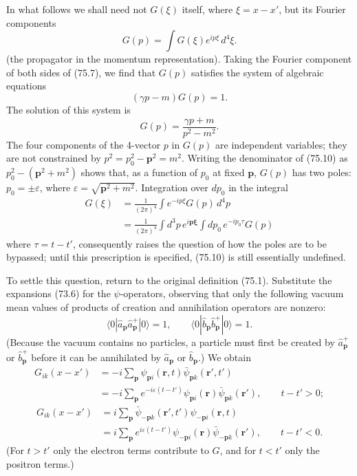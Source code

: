 In what follows we shall need not $G(\xi)$ itself, where $\xi=x-x'$, but its Fourier components
\begin{equation}
G(p)=\int G(\xi)e^{ip\xi}\,d^4\xi.
\tag{75.8}
\end{equation}
(the propagator in the momentum representation). Taking the Fourier component of both sides of (75.7), we find that $G(p)$ satisfies the system of algebraic equations
\begin{equation}
(\gamma p-m)G(p)=1.
\tag{75.9}
\end{equation}
The solution of this system is
\begin{equation}
G(p)=\frac{\gamma p+m}{p^2-m^2}.
\tag{75.10}
\end{equation}
The four components of the 4-vector $p$ in $G(p)$ are independent variables; they are not constrained by $p^2=p_0^2-\mathbf p^2=m^2$. Writing the denominator of (75.10) as $p_0^2-(\mathbf p^2+m^2)$ shows that, as a function of $p_0$ at fixed $\mathbf p$, $G(p)$ has two poles: $p_0=\pm\varepsilon$, where $\varepsilon=\sqrt{\mathbf p^2+m^2}$. Integration over $dp_0$ in the integral
\begin{equation}
\begin{aligned}
G(\xi)&=\frac{1}{(2\pi)^4}\int e^{-ip\xi}G(p)\,d^4p\\
&=\frac{1}{(2\pi)^4}\int d^3p\,e^{i\mathbf p\boldsymbol\xi}
\int dp_0\,e^{-ip_0\tau}G(p)
\end{aligned}
\tag{75.11}
\end{equation}
where $\tau=t-t'$, consequently raises the question of how the poles are to be bypassed; until this prescription is specified, (75.10) is still essentially undefined.

To settle this question, return to the original definition (75.1). Substitute the expansions (73.6) for the $\psi$-operators, observing that only the following vacuum mean values of products of creation and annihilation operators are nonzero:
\[
\langle0|\hat a_{\mathbf p}\hat a_{\mathbf p}^+|0\rangle=1,
\qquad
\langle0|\hat b_{\mathbf p}\hat b_{\mathbf p}^+|0\rangle=1.
\]
(Because the vacuum contains no particles, a particle must first be created by $\hat a_{\mathbf p}^+$ or $\hat b_{\mathbf p}^+$ before it can be annihilated by $\hat a_{\mathbf p}$ or $\hat b_{\mathbf p}$.) We obtain
\begin{equation}
\begin{aligned}
G_{ik}(x-x')&=-i\sum_{\mathbf p}\psi_{\mathbf p i}(\mathbf r,t)
\bar\psi_{\mathbf p k}(\mathbf r',t')\\
&=-i\sum_{\mathbf p}e^{-i\varepsilon(t-t')}
\psi_{\mathbf p i}(\mathbf r)\bar\psi_{\mathbf p k}(\mathbf r'),
\qquad t-t'>0;
\end{aligned}
\tag{75.12}
\end{equation}
\[
\begin{aligned}
G_{ik}(x-x')&=i\sum_{\mathbf p}\bar\psi_{-\mathbf p k}(\mathbf r',t')
\psi_{-\mathbf p i}(\mathbf r,t)\\
&=i\sum_{\mathbf p}e^{i\varepsilon(t-t')}
\psi_{-\mathbf p i}(\mathbf r)\bar\psi_{-\mathbf p k}(\mathbf r'),
\qquad t-t'<0.
\end{aligned}
\]
(For $t>t'$ only the electron terms contribute to $G$, and for $t<t'$ only the positron terms.)

